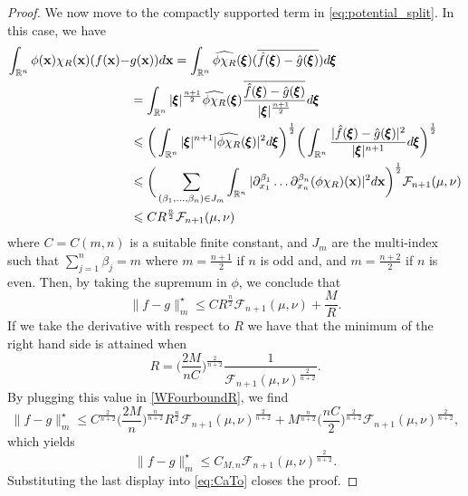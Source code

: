 \documentclass{article}
\renewcommand{\le}{\leqslant}
\def\bx{{\bf x}}
\def\bxi{{\pmb\xi}}
\def \erre{\mathbb{R}}
\newtheorem{proof}{Proof}
\begin{document}
\begin{proof}
% 
We now move to the compactly supported term in \eqref{eq:potential_split}.
% 
In this case, we have
\begin{align*}
    \int_{\erre^n}\phi(\bx)\chi_R(\bx)(f(\bx)-&g(\bx))d\bx=\int_{\erre^n}\widehat{\phi\chi_R}(\bxi)(\overline{\hat{f}(\bxi)-\hat{g}(\bxi)})d\bxi\\
    &=\int_{\erre^n}|\bxi|^{\frac{n+1}{2}}\widehat{\phi\chi_R}(\bxi)\frac{\overline{\hat{f}(\bxi)-\hat{g}(\bxi)}}{|\bxi|^{\frac{n+1}{2}}}d\bxi\\
    &\le\bigg(\int_{\erre^n}|\bxi|^{n+1}|\widehat{\phi\chi_R}(\bxi)|^2d\bxi\bigg)^\frac{1}{2}\bigg(\int_{\erre^n}\frac{|\hat{f}(\bxi)-\hat{g}(\bxi)|^{2}}{|\bxi|^{n+1}}d\bxi\bigg)^\frac{1}{2}\\
    &\le \bigg(\sum_{(\beta_1,\dots,\beta_n)\in J_m} \int_{\erre^n}|\partial^{\beta_1}_{x_1}\dots\partial^{\beta_n}_{x_n}(\phi\chi_R)(\bx)|^2d\bx\bigg)^\frac{1}{2} \mathcal{F}_{n+1}(\mu,\nu)\\
    &\le C R^{\frac{n}{2}}\mathcal{F}_{n+1}(\mu,\nu)
\end{align*}
where $C=C(m,n)$ is a suitable finite constant, and $J_m$ are the multi-index such that $\sum_{j=1}^n\beta_j=m$ where $m = \frac{n+1}{2}$ if $n$ is odd and, and $m= \frac{n+2}{2}$ if $n$ is even. 
% 
Then, by taking the supremum in $\phi$, we conclude that
\begin{equation}
\label{WFourboundR}
   \|f-g\|_m^\star \le CR^{\frac{n}{2}}\mathcal{F}_{n+1}(\mu,\nu)+\frac{M}{R}.
\end{equation}
If we take the derivative with respect to $R$ we have that the minimum of the right hand side is attained when
\[
    R=\bigg(\frac{2M}{nC}\bigg)^{\frac{2}{n+2}}\frac{1}{\mathcal{F}_{n+1}(\mu,\nu)^{\frac{2}{n+2}}}.
\]
By plugging this value in \eqref{WFourboundR}, we find
\begin{equation}
\label{WFourboundR1}
    \|f-g\|_m^\star\le C^{\frac{2}{n+2}}\bigg(\frac{2M}{n}\bigg)^{\frac{n}{n+2}}R^{\frac{n}{2}}\mathcal{F}_{n+1}(\mu,\nu)^{\frac{2}{n+2}}+M^{\frac{n}{n+2}}\bigg(\frac{nC}{2}\bigg)^{\frac{2}{n+2}}\mathcal{F}_{n+1}(\mu,\nu)^{\frac{2}{n+2}},
\end{equation}
which yields
\begin{equation}
   \|f-g\|_m^\star\le C_{M,n}\mathcal{F}_{n+1}(\mu,\nu)^{\frac{2}{n+2}}.
\end{equation}
Substituting the last display into \eqref{eq:CaTo} closes the proof.
\end{proof}
\end{document}
